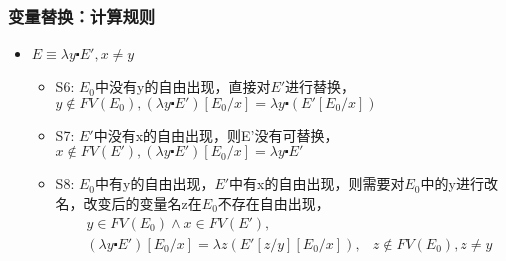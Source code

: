 \documentclass[CJKutf8,compress,hyperref]{beamer}
\begin{document}
\begin{CJK}{UTF8}{song}
\begin{frame}
  \frametitle{变量替换：计算规则} 
  \begin{itemize}
  \item  $E \equiv \lambda y \centerdot E', x \neq y$ 
    \begin{itemize}
    \item {S6:} $E_0$中没有y的自由出现，直接对$E'$进行替换，
      $ y \not \in FV(E_0),   (\lambda y
      \centerdot E') [E_0/x] = \lambda y \centerdot
      (E'[E_0/x]) $
    \item {S7:} $E'$中没有x的自由出现，则E'没有可替换，
      $ x \not \in FV(E'),   (\lambda y \centerdot E')
      [E_0/x] = \lambda y
      \centerdot E' $
    \item{S8:}  $E_0$中有y的自由出现，$E'$中有x的自由出现，则需要对$E_0$中的y进行改名，改变后的变量名z在$E_0$不存在自由出现，   
      \begin{eqnarray*}
        &y \in FV(E_0) \wedge x \in FV(E'), & \\   
        & (\lambda y  \centerdot  E') [E_0/x] 
          = \lambda z  (E'[z/y]  [E_0/x]),  
                                            & z \not \in FV(E_0), z \neq y   
      \end{eqnarray*} 
    \end{itemize}
  \end{itemize}
\end{frame}


\end{CJK}
\end{document}
